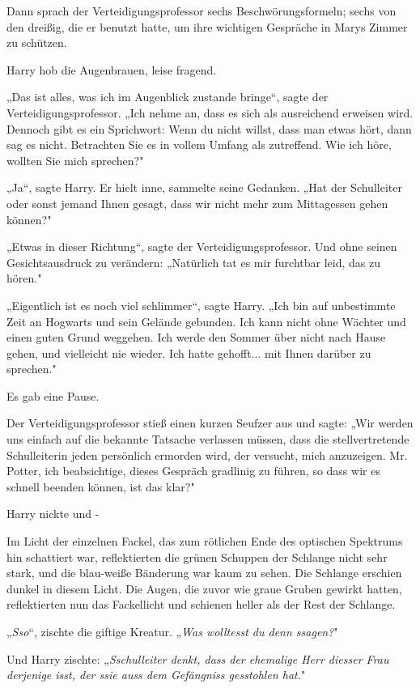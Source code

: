 {Dann sprach der Verteidigungsprofessor sechs Beschwörungsformeln; sechs von den dreißig, die er benutzt hatte, um ihre wichtigen Gespräche in Marys Zimmer zu schützen.

Harry hob die Augenbrauen, leise fragend.

„Das ist alles, was ich im Augenblick zustande bringe“, sagte der Verteidigungsprofessor. „Ich nehme an, dass es sich als ausreichend erweisen wird. Dennoch gibt es ein Sprichwort: Wenn du nicht willst, dass man etwas hört, dann sag es nicht. Betrachten Sie es in vollem Umfang als zutreffend. Wie ich höre, wollten Sie mich sprechen?"

„Ja“, sagte Harry. Er hielt inne, sammelte seine Gedanken. „Hat der Schulleiter oder sonst jemand Ihnen gesagt, dass wir nicht mehr zum Mittagessen gehen können?"

„Etwas in dieser Richtung“, sagte der Verteidigungsprofessor. Und ohne seinen Gesichtsausdruck zu verändern: „Natürlich tat es mir furchtbar leid, das zu hören."

„Eigentlich ist es noch viel schlimmer“, sagte Harry. „Ich bin auf unbestimmte Zeit an Hogwarts und sein Gelände gebunden. Ich kann nicht ohne Wächter und einen guten Grund weggehen. Ich werde den Sommer über nicht nach Hause gehen, und vielleicht nie wieder. Ich hatte gehofft... mit Ihnen darüber zu sprechen."

Es gab eine Pause.

Der Verteidigungsprofessor stieß einen kurzen Seufzer aus und sagte: „Wir werden uns einfach auf die bekannte Tatsache verlassen müssen, dass die stellvertretende Schulleiterin jeden persönlich ermorden wird, der versucht, mich anzuzeigen. Mr. Potter, ich beabsichtige, dieses Gespräch gradlinig zu führen, so dass wir es schnell beenden können, ist das klar?"

Harry nickte und -

Im Licht der einzelnen Fackel, das zum rötlichen Ende des optischen Spektrums hin schattiert war, reflektierten die grünen Schuppen der Schlange nicht sehr stark, und die blau-weiße Bänderung war kaum zu sehen. Die Schlange erschien dunkel in diesem Licht. Die Augen, die zuvor wie graue Gruben gewirkt hatten, reflektierten nun das Fackellicht und schienen heller als der Rest der Schlange.

„\emph{Sso}“, zischte die giftige Kreatur. „\emph{Was wolltesst du denn ssagen?}"

Und Harry zischte: „\emph{Sschulleiter denkt, dass der ehemalige Herr diesser Frau derjenige isst, der ssie auss dem Gefängniss gesstohlen hat.}"

}
